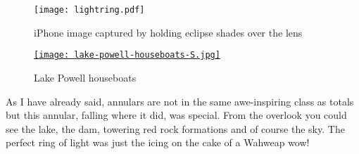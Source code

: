 
\captionsetup[figure]{labelformat=empty}
\begin{figure}[ht]
\centering
\begin{minipage}[b]{0.46\textwidth}
\texttt{[image: lightring.pdf]}\label{fig:2818X2}
\caption{iPhone image captured by holding eclipse shades over the lens}
\end{minipage}
\hspace{8pt}
\begin{minipage}[b]{0.48\textwidth}
\centering
\href{http://conceptcontrol.smugmug.com/Trips/USA-and-Canada/Arizona-Toodling-1/7475075\_MrjqMc}{\texttt{[image: lake-powell-houseboats-S.jpg]}}
\caption{Lake Powell houseboats}
\label{fig:2818X3}
\end{minipage}
\end{figure}

As I have already said, annulars are not in the same awe-inspiring class
as totals but this annular, falling where it did, was special. From the
overlook you could see the lake, the dam, towering red rock formations
and of course the sky. The perfect ring of light was just the icing on
the cake of a Wahweap wow!









%